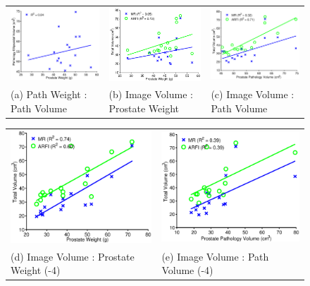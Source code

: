 \begin{figure}[htb!]
\centering
\begin{tabular}{lll}
\includegraphics[width=0.3\linewidth]{figs/corr_path_vol_weight_vol} &
\includegraphics[width=0.3\linewidth]{figs/corr_weight_vol} &
\includegraphics[width=0.3\linewidth]{figs/corr_pathVol_vol} \\
(a) Path Weight : Path Volume & (b) Image Volume : Prostate Weight & (c) Image Volume : Path Volume \\
\end{tabular}
\begin{tabular}{ll}
\includegraphics[width=0.3\linewidth]{figs/corr_weight_vol_no4} &
\includegraphics[width=0.3\linewidth]{figs/corr_pathVol_vol_no4} \\
(d) Image Volume : Prostate Weight (-4) & (e) Image Volume : Path Volume (-4) \\

\end{tabular}
\end{figure}
